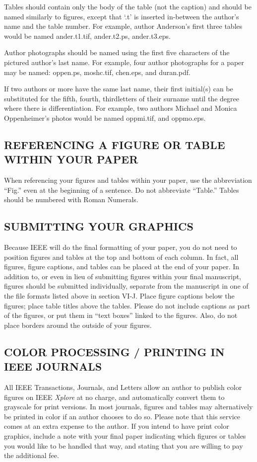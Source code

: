 \documentclass{IEEEoj-data}
\begin{document}
{Tables should contain only the body of the table (not the caption) and 
should be named similarly to figures, except that `.t' is inserted 
in-between the author's name and the table number. For example, author 
Anderson's first three tables would be named ander.t1.tif, ander.t2.ps, 
ander.t3.eps.

Author photographs should be named using the first five characters of the 
pictured author's last name. For example, four author photographs for a 
paper may be named: oppen.ps, moshc.tif, chen.eps, and duran.pdf.

If two authors or more have the same last name, their first initial(s) can 
be substituted for the fifth, fourth, third\textellipsis letters of their surname 
until the degree where there is differentiation. For example, two authors 
Michael and Monica Oppenheimer's photos would be named oppmi.tif, and 
oppmo.eps.

\subsection*{REFERENCING A FIGURE OR TABLE WITHIN YOUR PAPER}
When referencing your figures and tables within your paper, use the 
abbreviation ``Fig.'' even at the beginning of a sentence. Do not abbreviate 
``Table.'' Tables should be numbered with Roman Numerals.

\subsection*{SUBMITTING YOUR GRAPHICS}
Because IEEE will do the final formatting of your paper, 
you do not need to position figures and tables at the top and bottom of each 
column. In fact, all figures, figure captions, and tables can be placed at 
the end of your paper. In addition to, or even in lieu of submitting figures 
within your final manuscript, figures should be submitted individually, 
separate from the manuscript in one of the file formats listed above in 
section VI-J. Place figure captions below the figures; place table titles 
above the tables. Please do not include captions as part of the figures, or 
put them in ``text boxes'' linked to the figures. Also, do not place borders 
around the outside of your figures.

\subsection*{COLOR PROCESSING / PRINTING IN IEEE JOURNALS}
All IEEE Transactions, Journals, and Letters allow an author to publish 
color figures on IEEE \textit{Xplore}{\textregistered} at no charge, and automatically 
convert them to grayscale for print versions. In most journals, figures and 
tables may alternatively be printed in color if an author chooses to do so. 
Please note that this service comes at an extra expense to the author. If 
you intend to have print color graphics, include a note with your final 
paper indicating which figures or tables you would like to be handled that 
way, and stating that you are willing to pay the additional fee.

}
\end{document}
